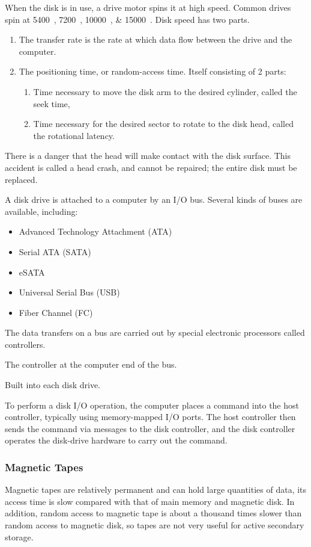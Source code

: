 When the disk is in use, a drive motor spins it at high speed.
Common drives spin at \SIlist{5400; 7200; 10000; 15000}{\rpm}.
Disk speed has two parts.
\begin{enumerate}[noitemsep]
\item The transfer rate is the rate at which data flow between the drive and the computer.
\item The positioning time, or random-access time. Itself consisting of 2 parts:
  \begin{enumerate}[noitemsep]
  \item Time necessary to move the disk arm to the desired cylinder, called the seek time,
  \item Time necessary for the desired sector to rotate to the disk head, called the rotational latency.
  \end{enumerate}
\end{enumerate}

There is a danger that the head will make contact with the disk surface.
This accident is called a head crash, and cannot be repaired; the entire disk must be replaced.

A disk drive is attached to a computer by an I/O bus.
Several kinds of buses are available, including:
\begin{itemize}[noitemsep]
\item Advanced Technology Attachment (ATA)
\item Serial ATA (SATA)
\item eSATA
\item Universal Serial Bus (USB)
\item Fiber Channel (FC)
\end{itemize}

The data transfers on a bus are carried out by special electronic processors called controllers.
\begin{description}[noitemsep]
\item[Host Controller:] The controller at the computer end of the bus.
\item[Disk Controller:] Built into each disk drive.
\end{description}

To perform a disk I/O operation, the computer places a command into the host controller, typically using memory-mapped I/O ports.
The host controller then sends the command via messages to the disk controller, and the disk controller operates the disk-drive hardware to carry out the command.

\subsubsection{Magnetic Tapes}\label{subsubsec:Magnetic_Tapes}
Magnetic tapes are relatively permanent and can hold large quantities of data, its access time is slow compared with that of main memory and magnetic disk.
In addition, random access to magnetic tape is about a thousand times slower than random access to magnetic disk, so tapes are not very useful for active secondary storage.


